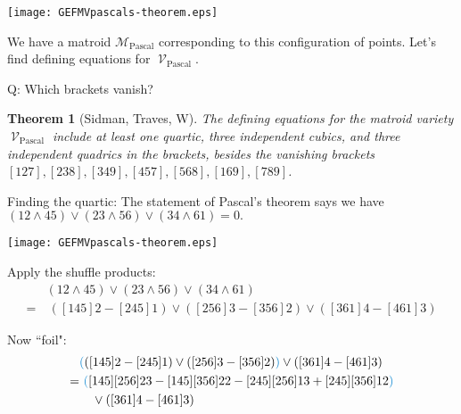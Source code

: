 \documentclass[%
	12pt]{beamer}
\theoremstyle{plain}
\newtheorem{thm}{Theorem}
\theoremstyle{definition}
\DeclareMathOperator{\Var}{\mathcal V}
\begin{document}
\begin{frame}{}{}
\begin{center}
\texttt{[image: GEFMVpascals-theorem.eps]}
\end{center}

We have a matroid $\mathscr M_{\text{Pascal}}$ corresponding to this configuration of points.  \pause  Let's find defining equations for $\Var_{\text{Pascal}}$.

\pause
\vspace{1pc}
{\color{powCol}Q:} Which brackets vanish?
\end{frame}

\begin{frame} 
\begin{thm}[Sidman, Traves, W] 
The defining equations for the matroid variety $\Var_{\text{Pascal}}$ include at least one quartic, three independent cubics, and three independent quadrics in the brackets, besides the vanishing brackets
$
[127], [238], [349], [457], [568], [169], [789]$.
\end{thm}
\end{frame}

\begin{frame}{}{}
{\color{powCol}Finding the quartic:}
The statement of Pascal's theorem says we have 
$%
(12\wedge 45)\vee (23\wedge 56)\vee (34\wedge 61) = 0.
$%

\begin{center}
\texttt{[image: GEFMVpascals-theorem.eps]}
\end{center}
\end{frame}

\begin{frame}
Apply the shuffle products:
\begin{align*}
& (12\wedge 45)\vee (23\wedge 56)\vee (34\wedge 61) \\
 =&\ ([145]2-[245]1)\vee([256]3-[356]2)\vee([361]4-[461]3) 
\end{align*}
\end{frame}

\begin{frame}
Now ``foil":
\begin{align*}
 & {\color{powCol}(}([145]2-[245]1)\vee([256]3-[356]2){\color{powCol})}\vee([361]4-[461]3)  \\ 
 =&\ 
 {\color{powCol}(}[145][256]23-[145][356]22-[245][256]13+[245][356]12{\color{powCol})} \\
 & \quad \vee([361]4-[461]3) 
\end{align*}
\end{frame}
\end{document}
